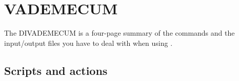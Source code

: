 \chapter{VADEMECUM}


The DIVADEMECUM is a four-page summary of the commands and the input/output files you have to deal with when using \diva.

\minitoc


\newpage

\vspace*{-3cm}
\section{Scripts and actions}
\begin{table}[H]
\centering
\caption[DIVADEMECUM: \diva input and output files]{DIVADEMECUM: \diva in- and outputs. When not specified differently, input files are from directory  {\tt ./input} and 
output files are placed in directory {\tt ./output}. Script {\tt divarefe} takes the same inputs as {\tt divacalc}
while {\tt divaanom} and {\tt divasumup} use no other user-provided files than the other scripts. Brackets {\tt [ ]} enclose optional files or parameters. Ex. {\tt [-r]} will replace an input file by the outputs from the scripts.\label{vdm}}



\end{table}
